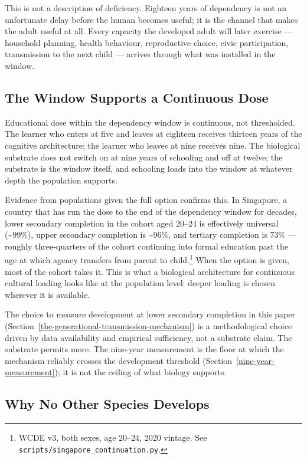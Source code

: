 \documentclass[12pt,letterpaper]{article}
\begin{document}
This is not a description of deficiency. Eighteen years of
dependency is not an unfortunate delay before the human becomes
useful; it is the channel that makes the adult useful at all. Every
capacity the developed adult will later exercise --- household
planning, health behaviour, reproductive choice, civic participation,
transmission to the next child --- arrives through what was installed
in the window.

\subsection{The Window Supports a Continuous Dose}\label{the-window-supports-a-continuous-dose}

Educational dose within the dependency window is continuous, not
thresholded. The learner who enters at five and leaves at eighteen
receives thirteen years of the cognitive architecture; the learner
who leaves at nine receives nine. The biological substrate does not
switch on at nine years of schooling and off at twelve; the substrate
is the window itself, and schooling loads into the window at whatever
depth the population supports.

Evidence from populations given the full option confirms this. In
Singapore, a country that has run the dose to the end of the
dependency window for decades, lower secondary completion in the
cohort aged 20--24 is effectively universal (\textasciitilde 99\%),
upper secondary completion is \textasciitilde 96\%, and tertiary
completion is 73\% --- roughly three-quarters of the cohort
continuing into formal education past the age at which agency
transfers from parent to child.\footnote{WCDE v3, both sexes, age
20--24, 2020 vintage. See \nolinkurl{scripts/singapore_continuation.py}.}
When the option is given, most of the cohort takes it. This is what a
biological architecture for continuous cultural loading looks like at
the population level: deeper loading is chosen wherever it is
available.

The choice to measure development at lower secondary completion in
this paper (Section~\ref{the-generational-transmission-mechanism}) is
a methodological choice driven by data availability and empirical
sufficiency, not a substrate claim. The substrate permits more. The
nine-year measurement is the floor at which the mechanism reliably
crosses the development threshold
(Section~\ref{nine-year-measurement}); it is not the ceiling of what
biology supports.

\subsection{Why No Other Species Develops}\label{why-no-other-species-develops}
\end{document}
